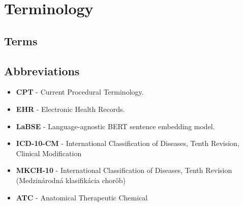 
\chapter*{Terminology}

\section*{Terms}

    \setlength\itemsep{1px}

\section*{Abbreviations}

\begin{itemize}
    \setlength\itemsep{1px}
    \item \textbf{CPT} - Current Procedural Terminology.
    \item \textbf{EHR} - Electronic Health Records.
    \item \textbf{LaBSE} - Language-agnostic BERT sentence embedding model.
    \item \textbf{ICD-10-CM} - International Classification of Diseases, Tenth Revision, Clinical Modification
    \item \textbf{MKCH-10} - International Classification of Diseases, Tenth Revision (Medzinárodná klasifikácia chorôb)
    \item \textbf{ATC} - Anatomical Therapeutic Chemical
\end{itemize}



